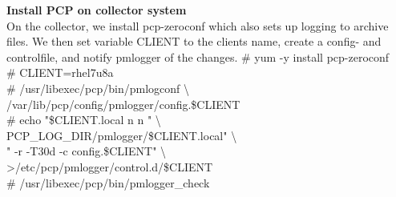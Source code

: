 \documentclass[12pt]{article}
\begin{document}
\begin{tcbposter}
{		\textbf{Install PCP on collector system} \\
	On the collector, we install pcp-zeroconf which also sets up logging to archive files.
	We then set variable CLIENT to the clients name, create a config- and controlfile,
	and notify pmlogger of the changes.
	\footnotesize{
	    \hspace*{0.5cm}\# yum -y install pcp-zeroconf \\
	    \hspace*{0.5cm}\# CLIENT=rhel7u8a \\
	    \hspace*{0.5cm}\# /usr/libexec/pcp/bin/pmlogconf \textbackslash \\
	    \hspace*{1.1cm}   /var/lib/pcp/config/pmlogger/config.\$CLIENT \\
	    \hspace*{0.5cm}\# echo "\$CLIENT.local n n " \textbackslash \\
	    \hspace*{1.1cm}   PCP\_LOG\_DIR/pmlogger/\$CLIENT.local" \textbackslash \\
	    \hspace*{1.1cm}   " -r -T30d -c config.\$CLIENT" \textbackslash \\
	    \hspace*{1.1cm}   \textgreater/etc/pcp/pmlogger/control.d/\$CLIENT \\
	    \hspace*{0.5cm}\# /usr/libexec/pcp/bin/pmlogger\_check
	}



}

\end{tcbposter}
\end{document}
